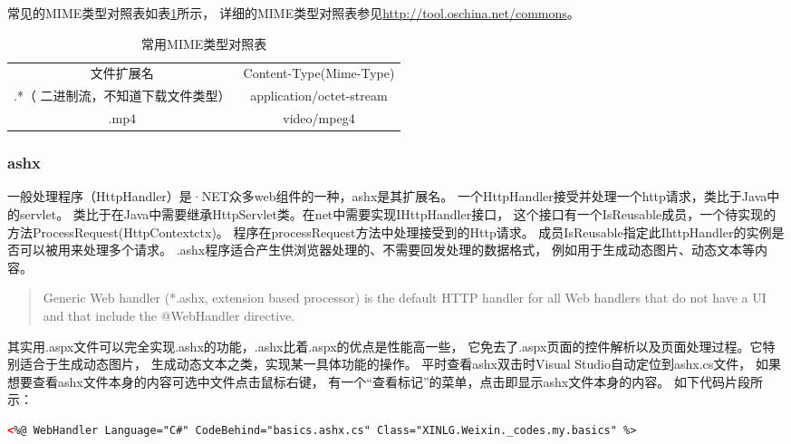 \documentclass{book}
\begin{document}
常见的MIME类型对照表如表\ref{table:MineType}所示，
详细的MIME类型对照表参见\url{http://tool.oschina.net/commons}。

\begin{table}\caption[Caption for LOF]{常用MIME类型对照表}\label{table:MineType}					
	\medskip
	\centering		
	\begin{tabular}{|c|c|}
		\hline
		\multirow{1}{*}{文件扩展名}		
		& \multicolumn{1}{c|}{Content-Type(Mime-Type)}\\			
		\cline{1-2}
		 .*（ 二进制流，不知道下载文件类型） &  application/octet-stream\\
		\hline
		.mp4 & video/mpeg4\\
		\hline		
	\end{tabular}
\end{table}

\subsubsection{ashx}

一般处理程序（HttpHandler）是·NET众多web组件的一种，ashx是其扩展名。
一个HttpHandler接受并处理一个http请求，类比于Java中的servlet。
类比于在Java中需要继承HttpServlet类。在net中需要实现IHttpHandler接口，
这个接口有一个IsReusable成员，一个待实现的方法ProcessRequest(HttpContextctx)。
程序在processRequest方法中处理接受到的Http请求。
成员IsReusable指定此IhttpHandler的实例是否可以被用来处理多个请求。
.ashx程序适合产生供浏览器处理的、不需要回发处理的数据格式，
例如用于生成动态图片、动态文本等内容。

\begin{quotation}
Generic Web handler (*.ashx, extension based processor) is the default 
HTTP handler for all Web handlers that do not have a UI and that include the @WebHandler directive. 
\end{quotation}

其实用.aspx文件可以完全实现.ashx的功能，.ashx比着.aspx的优点是性能高一些，
它免去了.aspx页面的控件解析以及页面处理过程。它特别适合于生成动态图片，
生成动态文本之类，实现某一具体功能的操作。
平时查看ashx双击时Visual Studio自动定位到ashx.cs文件，
如果想要查看ashx文件本身的内容可选中文件点击鼠标右键，
有一个“查看标记”的菜单，点击即显示ashx文件本身的内容。
如下代码片段所示：

\begin{lstlisting}[language=HTML]
<%@ WebHandler Language="C#" CodeBehind="basics.ashx.cs" Class="XINLG.Weixin._codes.my.basics" %>
\end{lstlisting}
\end{document}
